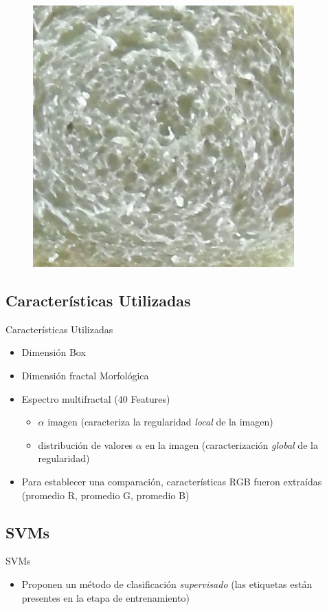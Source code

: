 \documentclass{beamer}
\begin{document}
\begin{frame}
\begin{itemize}
\begin{figure}
\includegraphics[scale=0.2]{../imagenes/camera/b}
\end{figure}


\end{itemize}
\end{frame}

\subsection{Caracter\'isticas Utilizadas}
\begin{frame}
{\huge Caracter\'isticas Utilizadas}
\begin{itemize}
\item Dimensi\'on Box
\item Dimensi\'on fractal Morfol\'ogica
\item Espectro multifractal ($40$ Features)
    \begin{itemize}
        \item $\alpha$ imagen (caracteriza la regularidad {\em local} de la imagen)
        \item distribuci\'on de valores $\alpha$ en la imagen (caracterizaci\'on {\em global} de la regularidad)
    \end{itemize}
\item Para establecer una comparaci\'on, caracter\'isticas RGB fueron extra\'idas (promedio R, promedio G, promedio B)
\end{itemize}

\end{frame}


\subsection{SVMs}
\begin{frame}
{\huge SVMs}
\begin{center}
\begin{itemize}
\item Proponen un m\'etodo de clasificaci\'on {\em supervisado} (las etiquetas est\'an presentes en la etapa de entrenamiento)
\end{itemize}

\end{center}
\end{frame}
\end{document}
